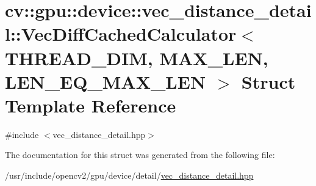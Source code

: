 \hypertarget{structcv_1_1gpu_1_1device_1_1vec__distance__detail_1_1VecDiffCachedCalculator}{\section{cv\-:\-:gpu\-:\-:device\-:\-:vec\-\_\-distance\-\_\-detail\-:\-:Vec\-Diff\-Cached\-Calculator$<$ T\-H\-R\-E\-A\-D\-\_\-\-D\-I\-M, M\-A\-X\-\_\-\-L\-E\-N, L\-E\-N\-\_\-\-E\-Q\-\_\-\-M\-A\-X\-\_\-\-L\-E\-N $>$ Struct Template Reference}
\label{structcv_1_1gpu_1_1device_1_1vec__distance__detail_1_1VecDiffCachedCalculator}
}


{\ttfamily \#include $<$vec\-\_\-distance\-\_\-detail.\-hpp$>$}



The documentation for this struct was generated from the following file\-:\begin{DoxyCompactItemize}
\item 
/usr/include/opencv2/gpu/device/detail/\hyperlink{vec__distance__detail_8hpp}{vec\-\_\-distance\-\_\-detail.\-hpp}\end{DoxyCompactItemize}
